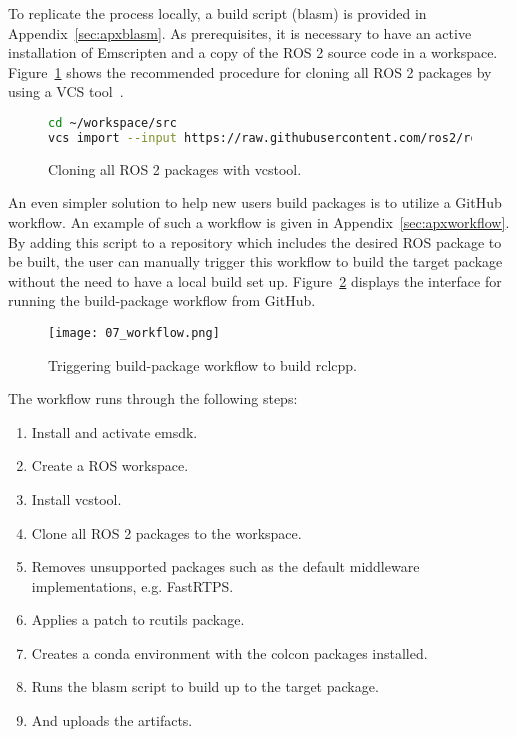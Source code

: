         To replicate the process locally, a build script (\textsf{blasm}) is provided in Appendix~\ref{sec:apxblasm}. As prerequisites, it is necessary to have an active installation of Emscripten and a copy of the \ac{ROS} 2 source code in a workspace. Figure~\ref{fig:vcs} shows the recommended procedure for cloning all \ac{ROS} 2 packages by using a \ac{VCS} tool~\cite{rosinstall}.

        \begin{figure}[htbp]
            \centering
            \begin{lstlisting}[language=Bash]
cd ~/workspace/src
vcs import --input https://raw.githubusercontent.com/ros2/ros2/humble/ros2.repos .
\end{lstlisting}
            \caption{Cloning all \ac{ROS} 2 packages with \textsf{vcstool}.}
            \label{fig:vcs}
        \end{figure}

        An even simpler solution to help new users build packages is to utilize a GitHub workflow. An example of such a workflow is given in Appendix~\ref{sec:apxworkflow}. By adding this script to a repository which includes the desired \ac{ROS} package to be built, the user can manually trigger this workflow to build the target package without the need to have a local build set up. Figure~\ref{fig:workflow} displays the interface for running the \textsf{build-package} workflow from GitHub.

        \begin{figure}[htbp]
            \centering
            \texttt{[image: 07\_workflow.png]}
            \caption{Triggering \textsf{build-package} workflow to build \textsf{rclcpp}.}
            \label{fig:workflow}
        \end{figure}

        The workflow runs through the following steps:

        \begin{enumerate}
            \item Install and activate \ac{emsdk}.
            \item Create a \ac{ROS} workspace.
            \item Install \textsf{vcstool}.
            \item Clone all \ac{ROS} 2 packages to the workspace.
            \item Removes unsupported packages such as the default middleware implementations, e.g. \textsf{FastRTPS}.
            \item Applies a patch to \textsf{rcutils} package.
            \item Creates a \textsf{conda} environment with the \textsf{colcon} packages installed.
            \item Runs the \textsf{blasm} script to build up to the target package.
            \item And uploads the artifacts.
        \end{enumerate}

